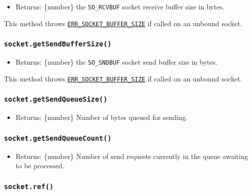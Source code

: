 \begin{itemize}
\tightlist
\item
  Returns: \{number\} the \texttt{SO\_RCVBUF} socket receive buffer size
  in bytes.
\end{itemize}

This method throws
\href{errors.md\#err_socket_buffer_size}{\texttt{ERR\_SOCKET\_BUFFER\_SIZE}}
if called on an unbound socket.

\subsubsection{\texorpdfstring{\texttt{socket.getSendBufferSize()}}{socket.getSendBufferSize()}}\label{socket.getsendbuffersize}

\begin{itemize}
\tightlist
\item
  Returns: \{number\} the \texttt{SO\_SNDBUF} socket send buffer size in
  bytes.
\end{itemize}

This method throws
\href{errors.md\#err_socket_buffer_size}{\texttt{ERR\_SOCKET\_BUFFER\_SIZE}}
if called on an unbound socket.

\subsubsection{\texorpdfstring{\texttt{socket.getSendQueueSize()}}{socket.getSendQueueSize()}}\label{socket.getsendqueuesize}

\begin{itemize}
\tightlist
\item
  Returns: \{number\} Number of bytes queued for sending.
\end{itemize}

\subsubsection{\texorpdfstring{\texttt{socket.getSendQueueCount()}}{socket.getSendQueueCount()}}\label{socket.getsendqueuecount}

\begin{itemize}
\tightlist
\item
  Returns: \{number\} Number of send requests currently in the queue
  awaiting to be processed.
\end{itemize}

\subsubsection{\texorpdfstring{\texttt{socket.ref()}}{socket.ref()}}\label{socket.ref}

